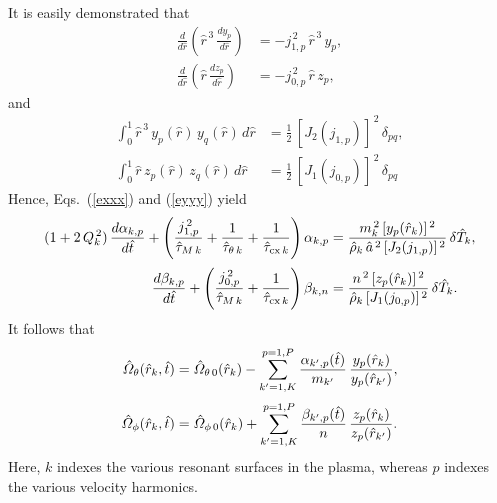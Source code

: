 \documentclass[notitlepage,12pt]{article}
\begin{document}
It is easily demonstrated that
\begin{align}
\frac{d}{d\hat{r}}\!\left(\hat{r}^{\,3}\,\frac{dy_p}{d\hat{r}}\right)& = - j_{1,p}^{\,2}\,\hat{r}^{\,3}\,y_p,\\[0.5ex]
\frac{d}{d\hat{r}}\!\left(\hat{r}\,\frac{dz_p}{d\hat{r}}\right) &= - j_{0,p}^{\,2}\,\hat{r}\,z_p,
\end{align}
and
\begin{align}
\int_0^{1}\hat{r}^{\,3}\,y_p(\hat{r})\,y_q(\hat{r})\,d\hat{r}& = \frac{1}{2}\,\left[J_2(j_{1,p})\right]^{\,2}\,\delta_{pq},\\[0.5ex]
\int_0^1\hat{r}\,z_p(\hat{r})\,z_q(\hat{r})\,d\hat{r}& = \frac{1}{2}\,\left[J_1(j_{0,p})\right]^{\,2}\,\delta_{pq}\label{e162}
\end{align}
Hence, Eqs.~(\ref{exxx}) and (\ref{eyyy}) yield
\begin{align}
(1+2\,Q_k^{\,2})\,\frac{d\alpha_{k,p}}{d\hat{t}}
+\left(\frac{j_{1,p}^{\,2}}{\hat{\tau}_{M\,k}} + \frac{1}{\hat{\tau}_{\theta\,k}}+ \frac{1}{\hat{\tau}_{{\rm cx}\,k}}\right)\alpha_{k,p}&=
\frac{m_k^{\,2}\,[y_p(\hat{r}_k)]^{\,2}}{\hat{\rho}_k\,\hat{a}^{\,2}\,
[J_2(j_{1,p})]^{\,2}}\,\delta \hat{T}_k,\\[0.5ex]
\frac{d\beta_{k,p}}{d\hat{t}}
+\left(\frac{j_{0,p}^{\,2}}{\hat{\tau}_{M\,k}} + \frac{1}{\hat{\tau}_{{\rm cx}\,k}}\right)\beta_{k,n}&=
\frac{n^{\,2}\,[z_p(\hat{r}_k)]^{\,2}}{\hat{\rho}_k\,
[J_1(j_{0,p})]^{\,2}}\,\delta \hat{T}_k.
\end{align}
It follows that
\begin{align}\label{errr}
\hat{\mit\Omega}_\theta(\hat{r}_k,\hat{t}) &=
\hat{\mit\Omega}_{\theta\,0}(\hat{r}_k) - \sum_{k'=1,K}^{p=1,P} \frac{\alpha_{k',p}(\hat{t})}{m_{k'}}\,\frac{y_p(\hat{r}_k)}{y_p(\hat{r}_{k'})},\\[0.5ex]
\hat{\mit\Omega}_\phi(\hat{r}_k,\hat{t}) &=
\hat{\mit\Omega}_{\phi\,0}(\hat{r}_k) + \sum_{k'=1,K}^{p=1,P} \frac{\beta_{k',p}(\hat{t})}{n}\,\frac{z_p(\hat{r}_k)}{z_p(\hat{r}_{k'})}.\label{errt}
\end{align}
Here, $k$ indexes the various resonant surfaces in the plasma,
whereas $p$  indexes the various
velocity harmonics. 
\end{document}
